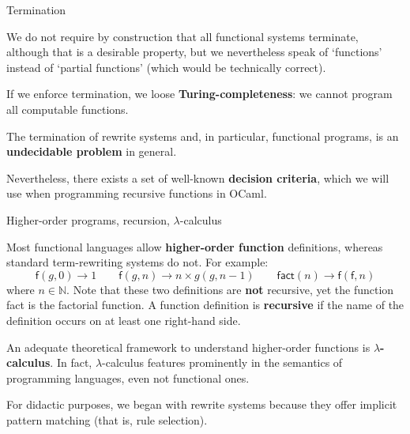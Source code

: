 \documentclass[compress,dvipdfmx]{beamer}
\newcommand{\OCaml}{\textsf{OCaml}\xspace}
\newcommand\fun[1]{\textsf{#1}}
\begin{document}
%
\begin{frame}{Termination}

  \label{termination2}

  We do not require by construction that all functional systems
  terminate, although that is a desirable property, but we
  nevertheless speak of `functions' instead of `partial functions'
  (which would be technically correct).

  \bigskip

  If we enforce termination, we loose
  \textbf{Turing\hyp{}completeness}: we cannot program all computable
  functions.

  \bigskip

  The termination of rewrite systems and, in particular, functional
  programs, is an \textbf{undecidable problem} in general.

  \bigskip

  Nevertheless, there exists a set of well\hyp{}known \textbf{decision
    criteria}, which we will use when programming recursive functions
  in \OCaml.

\end{frame}

%
\begin{frame}{Higher-order programs, recursion, $\lambda$-calculus}

  Most functional languages allow \textbf{higher\hyp{}order function}
  definitions, whereas standard term\hyp{}rewriting systems do
  not. For example:
  \begin{equation*}
    \fun{f}(g,0) \rightarrow 1
    \qquad
    \fun{f}(g,n) \rightarrow n \times g(g,n-1)
    \qquad
    \fun{fact}(n) \rightarrow \fun{f}(\fun{f},n)
  \end{equation*}
  where \(n \in \mathbb{N}\). Note that these two definitions are
  \textbf{not} recursive, yet the function \fun{fact} is the factorial
  function. A function definition is \textbf{recursive} if the name of
  the definition occurs on at least one right\hyp{}hand side.

  \bigskip

  An adequate theoretical framework to understand higher\hyp{}order
  functions is \textbf{\(\lambda\)-calculus}. In fact,
  \(\lambda\)-calculus features prominently in the semantics of
  programming languages, even not functional ones.

  \bigskip

  For didactic purposes, we began with rewrite systems because they
  offer implicit pattern matching (that is, rule selection).

\end{frame}
\end{document}
